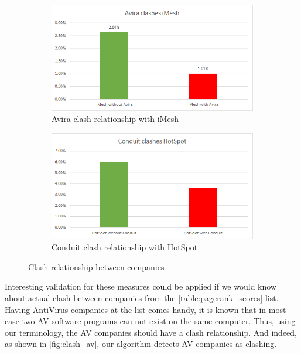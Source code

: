 \documentclass[11pt,oneside]{book}
\begin{document}
{{{{\begin{figure}[h]
\centering
\begin{subfigure}[b]{0.49\textwidth}
	\centering
\includegraphics[scale=0.49]{figures/clashAviraImesh.png}
\caption{Avira clash relationship with iMesh}
\label{fig:avira_clash_imesh}
\end{subfigure}
\begin{subfigure}[b]{0.49\textwidth}
	\centering
\includegraphics[scale=0.49]{figures/clashConduitHotSpot.png}
\caption{Conduit clash relationship with HotSpot}
\label{fig:conduit_clash_hotspot}
\end{subfigure}
\caption{Clash relationship between companies}
	\label{fig:clash_pagerank}
\end{figure}

Interesting validation for these measures could be applied if we would know about actual clash between companies from the \autoref{table:pagerank_scores} list. Having AntiVirus companies at the list comes handy, it is known that in most case two AV software programs can not exist on the same computer. Thus, using our terminology, the AV companies should have a clash relationship. And indeed, as shown in \autoref{fig:clash_av}, our algorithm detects AV companies as clashing.

}}}}
\end{document}
